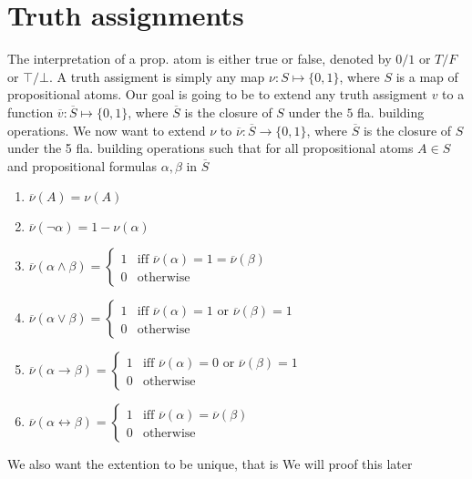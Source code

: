 \section{Truth assignments}
The interpretation of a prop. atom is either true or false, denoted by $0 / 1$ or $T / F$ or $\top / \bot$. 
A truth assigment is simply any map $\nu:S\mapsto \{0,1\}$, where $S$ is a map of propositional atoms. 
Our goal is going to be to extend any truth assigment $v$ to a function $\overline{v}: \overline{S}\mapsto \{0,1\}$, where $\overline{S}$ is the closure
of $S$ under the $5$ fla. building operations. 
We now want to extend $\nu$ to $\overline{\nu}: \overline{S}\to \{0,1\}$, where $\overline{S}$ is the closure of $S$ under the 5 fla. building operations such that
for all propositional atoms $A\in S$ and propositional formulas $\alpha,\beta$ in $\overline{S}$
\begin{enumerate}
    \item $\overline{\nu}(A) = \nu(A)$ 
    \item $\overline{\nu}(\lnot \alpha) = 1- \nu(\alpha)$ 
    \item $\overline{\nu}(\alpha \land \beta) = \begin{cases}
        1 & \text{iff } \overline{\nu}(\alpha) = 1 = \overline{\nu}(\beta)\\
        0 & \text{otherwise}
    \end{cases}$
    \item $\overline{\nu}(\alpha \lor \beta) = \begin{cases}
        1 & \text{iff } \overline{\nu}(\alpha) = 1 \text{ or } \overline{\nu}(\beta) = 1\\
        0 & \text{otherwise}
    \end{cases}$
    \item $\overline{\nu}(\alpha \to \beta) = \begin{cases}
        1 & \text{iff } \overline{\nu}(\alpha) = 0 \text{ or } \overline{\nu}(\beta) = 1\\
        0 & \text{otherwise}
    \end{cases}$
    \item $\overline{\nu}(\alpha \leftrightarrow \beta) = \begin{cases}
        1 & \text{iff } \overline{\nu}(\alpha) =  \overline{\nu}(\beta)\\
        0 & \text{otherwise}
    \end{cases}$
\end{enumerate}
We also want the extention to be unique, that is
We will proof this later\\

